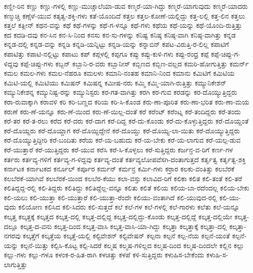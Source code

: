 {ಕಣ್ಣೀ-ರಿನ
ಕಣ್ಣು
ಕಣ್ಣು-ಗಳಲ್ಲಿ
ಕಣ್ಣು-ಮುಚ್ಚಾಲೆಯಾ-ಡುವ
ಕಣ್ಮರೆ-ಯಾ-ಗಿದ್ದು
ಕಣ್ಮರೆ-ಯಾಗುವುದು
ಕಣ್ಮರೆ-ಯಾದರು
ಕಣ್ಮುಚ್ಚಿ
ಕಣ್ಸೆಳೆ-ಯುವ
ಕತೃತ್ವ-ಶಕ್ತಿ-ಗಳು
ಕತೆ-ಯೊಂದಿದೆ
ಕತ್ತಲ
ಕತ್ತಲ-ಕೋಣೆ-ಯಲ್ಲಿದ್ದು
ಕತ್ತ-ಲಲ್ಲಿ
ಕತ್ತ-ಲಿನ
ಕತ್ತಲು
ಕತ್ತಲೆ
ಕತ್ಲೀನ್
ಕಥನ-ವನ್ನು
ಕಥೆ
ಕಥೆ-ಗಳನ್ನು
ಕಥೆ-ಗ-ಳನ್ನೂ
ಕಥೆ-ಗಳು
ಕಥೆಯ
ಕಥೆ-ಯನ್ನು
ಕಥೆ-ಯೊಂದಿ-ರುತ್ತಿತ್ತು
ಕದ
ಕದಡಿ-ದವು
ಕನ-ಸಿನ
ಕನ-ಸಿ-ನಿಂದ
ಕನಸು
ಕನ-ಸು-ಗಳನ್ನು
ಕನಿಷ್ಟ
ಕನಿಷ್ಠ
ಕನಿಷ್ಠ-ವಾಗಿ
ಕನಿಷ್ಠ-ವಾಗಿತ್ತು
ಕನ್ನಡ
ಕನ್ನಡ-ದಲ್ಲಿ
ಕನ್ನಡ-ವನ್ನು
ಕನ್ನಡಿ
ಕನ್ನಡಿ-ಯನ್ನಿಟ್ಟು
ಕನ್ನಡಿ-ಯನ್ನು
ಕನ್ನಾಬಿನ್
ಕಪಟ-ವಿರುತ್ತಿ-ರ-ಲಿಲ್ಲ
ಕಪಾಟಿಗೆ
ಕಪಾಟಿತ್ತು
ಕಪಾಟಿ-ನಲ್ಲಿಟ್ಟು
ಕಪಾಟು
ಕಪ್
ಕಪ್ಗಳಲ್ಲಿ
ಕಪ್ಪಗೂ
ಕಪ್ಪು
ಕಪ್ಪು-ಕುಳಿ-ಗಳು
ಕಪ್ಪು-ರಂಧ್ರ
ಕಪ್ಪೆ
ಕಪ್ಪೆ-ಚಿಪ್ಪು-ಗ-ಳಿದ್ದವು
ಕಪ್ಪೆ-ಚಿಪ್ಪು-ಗಳು
ಕಬ್ಬನ್
ಕಬ್ಬಾನಿ-ರ-ವರು
ಕಬ್ಬಾನೀಸ್
ಕಬ್ಬಿಣದ
ಕಬ್ಬಿಣ-ವಲ್ಲದ
ಕಮರಿ-ಹೋಗುತ್ತಿತ್ತು
ಕಮರ್ನ್
ಕಮಲ
ಕಮಲ-ಗಳು
ಕಮಲ-ನೆಹರೂ
ಕಮಲಳು
ಕಮಾನಿ-ನಂತಹ
ಕಮಾನಿ-ನಿಂದ
ಕಮಾನು
ಕಮಿಟಿಗೆ
ಕಮಿಟಿಯ
ಕಮಿಟಿ-ಯಲ್ಲಿ
ಕಮಿಟಿಯು
ಕಮಿಷನ್
ಕಮಿಷನ್ನ
ಕಮೀಷ-ನರು
ಕಮ್ಮಿ
ಕಮ್ಮಿ-ಯಾಗಿ-ರುತ್ತಿತ್ತು
ಕಮ್ಯುನಿಕೇಶನ್
ಕಮ್ಯುನಿಕೇಶನ್ನ
ಕಮ್ಯುನಿಷ್ಟ-ರನ್ನು
ಕಮ್ಯುನಿಸ್ಟರು
ಕರ-ಗತ-ವಾಗಿತ್ತು
ಕರಗಿ
ಕರ-ಗುವ
ಕರಡನ್ನು
ಕರ-ದೊಯ್ಯುತ್ತಿದ್ದರು
ಕರಾ-ರುವಾಕ್ಕಾಗಿ
ಕರಾವಳಿ
ಕರಿ
ಕರಿ-ಬಣ್ಣದ
ಕರಿಯ
ಕರಿ-ಸಿ-ಕೊಂಡ
ಕರು-ಣಾ-ಪೂರಿತ
ಕರು-ಣಾ-ಭರಿತ
ಕರು-ಣಾ-ಮಯ
ಕರುಣೆ
ಕರು-ಣೆ-ಯನ್ನೂ
ಕರು-ಣೆ-ಯಿಂದ
ಕರು-ಣೆ-ಯಿಲ್ಲ-ದಂತೆ
ಕರೆ
ಕರೆಂಟ್
ಕರೆಂಟ್ನ
ಕರೆ-ತಂದಿದ್ದರು
ಕರೆ-ತಂದು
ಕರೆ-ತರ
ಕರೆ-ತ-ರಲು
ಕರೆದ
ಕರೆ-ದರು
ಕರೆ-ದಾಗ
ಕರೆ-ದಿದ್ದ
ಕರೆ-ದು-ಕೊಂಡು
ಕರೆ-ದು-ಕೊಳ್ಳುತ್ತಿದ್ದರು
ಕರೆ-ದೊಯ್ದಂತೆ
ಕರೆ-ದೊಯ್ದರು
ಕರೆ-ದೊಯ್ದಾಗ
ಕರೆ-ದೊಯ್ದಿದ್ದೇನೆ
ಕರೆ-ದೊಯ್ದು
ಕರೆ-ದೊಯ್ಯ-ಲಾ-ಯಿತು
ಕರೆ-ದೊಯ್ಯುತ್ತಿದ್ದರು
ಕರೆ-ದೊಯ್ಯುತ್ತಿದ್ದೀರಿ
ಕರೆ-ಬಂದಿತು
ಕರೆಯ
ಕರೆ-ಯ-ಬಹುದು
ಕರೆ-ಯ-ಬೇಕು
ಕರೆ-ಯ-ಲಾಗುವ
ಕರೆ-ಯಲ್ಪ-ಡುವ
ಕರೆ-ಯುತ್ತಾರೆ
ಕರೆ-ಯುತ್ತಿದ್ದರು
ಕರೆ-ಯುವ
ಕರೆಸಿ
ಕರೆ-ಸಿ-ಕೊಳ್ಳಲು
ಕರೆ-ಸುತ್ತಿದ್ದರು
ಕರ್ಜನ್ರ-ವ-ರಿಗೆ
ಕರ್ಣ-ಗಳ
ಕರ್ತರು
ಕರ್ತವ್ಯ-ಗಳಿಗೆ
ಕರ್ತವ್ಯ-ಗ-ಳಿದ್ದವು
ಕರ್ತವ್ಯ-ದಂತೆ
ಕರ್ತವ್ಯಲೋಪವೆಸಗಿ-ದಂತಾಗುತ್ತದೆ
ಕರ್ತೃತ್ವ
ಕರ್ತೃತ್ವ-ಶಕ್ತಿ
ಕರ್ನಾಟಕ
ಕರ್ನಾಟಕದ
ಕರ್ನೂಲ್
ಕರ್ಪೂರ
ಕರ್ಮನ್
ಕರ್ಮನ್ರ
ಕರ್ಮಿ-ಗಳು
ಕರ್ರಾರ
ಕಲಕು-ವಂತಿತ್ತು
ಕಲಬೆರಕೆ
ಕಲಬೆರಕೆ-ಯಾಗಿವೆ
ಕಲಬೆರಕೆ-ಯಿಂದ
ಕಲಬೆರ-ಕೆಯು
ಕಲಾ-ವಸ್ತು
ಕಲಾವಿದ-ರಿಗೆ
ಕಲಿಕಾ
ಕಲಿತ
ಕಲಿ-ತಂತೆ
ಕಲಿ-ತರೆ
ಕಲಿತಿದ್ದದ್ದ-ರಲ್ಲಿ
ಕಲಿ-ತಿದ್ದರು
ಕಲಿತಿದ್ದು
ಕಲಿತಿದ್ದೆಲ್ಲ-ವನ್ನೂ
ಕಲಿತು
ಕಲಿತೆ
ಕಲಿಯ
ಕಲಿಯ-ಬಾ-ರದೆಂದಲ್ಲ
ಕಲಿಯ-ಬೇಕು
ಕಲಿ-ಯಲು
ಕಲಿ-ಯುತ್ತಾ
ಕಲಿ-ಯುತ್ತಾರೆ
ಕಲಿ-ಯುತ್ತಾ-ರೆಂದೇ
ಕಲಿಯು-ವಂತಾಗಿದೆ
ಕಲಿ-ಯುವುದ-ರಲ್ಲಿ
ಕಲಿ-ಯು-ವುದು
ಕಲಿಯೋಣ
ಕಲಿಸಿದ
ಕಲಿ-ಸಿದರು
ಕಲಿ-ಸುತ್ತದೆ
ಕಲೆ
ಕಲೆ-ಗಳ
ಕಲೆ-ಗಳಲ್ಲಿ
ಕಲೆ-ಗಾರಳು
ಕಲೆತು
ಕಲೆ-ಯನ್ನೂ
ಕಲ್ಕತ್ತ
ಕಲ್ಕತ್ತಕ್ಕೆ
ಕಲ್ಕತ್ತದ
ಕಲ್ಕತ್ತ-ದಲ್ಲಿ
ಕಲ್ಕತ್ತ-ದಲ್ಲಿದ್ದ
ಕಲ್ಕತ್ತ-ದಲ್ಲಿದ್ದು-ಕೊಂಡು
ಕಲ್ಕತ್ತ-ದಲ್ಲಿದ್ದೆ
ಕಲ್ಕತ್ತ-ದಲ್ಲಿಯೇ
ಕಲ್ಕತ್ತ-ದಲ್ಲೂ
ಕಲ್ಕತ್ತ-ದ-ವನು
ಕಲ್ಕತ್ತ-ದಿಂದ
ಕಲ್ಕತ್ತ-ವಾಸಿ
ಕಲ್ಕತ್ತ-ವಾಸಿ-ಯಾ-ಗಿದ್ದು
ಕಲ್ಕತ್ತಾ
ಕಲ್ಕತ್ತಾಕ್ಕೆ
ಕಲ್ಕತ್ತಾ-ದಲ್ಲಿ
ಕಲ್ಕತ್ತಾ-ನಗರವು
ಕಲ್ಕತ್ತೆಗೆ
ಕಲ್ಕತ್ತೆಯ
ಕಲ್ಕತ್ತೆ-ಯಲ್ಲಿ
ಕಲ್ಟಿವೇಶನ್
ಕಲ್ಟಿವೇಷನ್
ಕಲ್ಪನಾ
ಕಲ್ಪನೆ
ಕಲ್ಪ-ನೆಯ
ಕಲ್ಪನೆ-ಯಂತೆ
ಕಲ್ಪನೆ-ಯನ್ನು
ಕಲ್ಪನೆ-ಯಿತ್ತು
ಕಲ್ಪಿಸಿ-ಕೊಟ್ಟ
ಕಲ್ಪಿ-ಸಿದರೆ
ಕಲ್ಮಷ
ಕಲ್ಮಷ-ಗಳಿಲ್ಲದ
ಕಲ್ಮಷ-ದಿಂದ
ಕಲ್ಮಷ-ದಿಂದಲೇ
ಕಲ್ಲಿನ
ಕಲ್ಲು
ಕಲ್ಲು-ಗಳು
ಕಲ್ಲು-ಗಳೂ
ಕಳಂಕ-ರ-ಹಿತ-ರಾಗಿ
ಕಳಚಿತ್ತು
ಕಳಪೆ
ಕಳಿ-ಸುತ್ತಿದ್ದರು
ಕಳುಹಿಸ-ಬೇಕೆಂದು
ಕಳುಹಿ-ಸ-ಲಾಗುತ್ತಿತ್ತು
}

